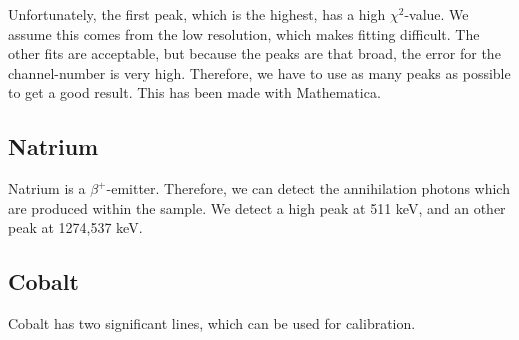 \documentclass[10pt,a4paper]{article}
\begin{document}
\newpage
Unfortunately, the first peak, which is the highest, has a high $\chi^{2}$-value. We assume this comes from the low resolution, which makes fitting difficult. The other  fits are acceptable, but because the peaks are that broad, the error for the channel-number is very high. Therefore, we have to use as many peaks as possible to get a good result. This has been made with Mathematica.

\subsection*{Natrium}
Natrium is a $\beta^{+}$-emitter. Therefore, we can detect the annihilation photons which are produced within the sample. We detect a high peak at 511 keV, and an other peak at 1274,537 keV.

\subsection*{Cobalt}
Cobalt has two significant lines, which can be used for calibration.
\end{document}
